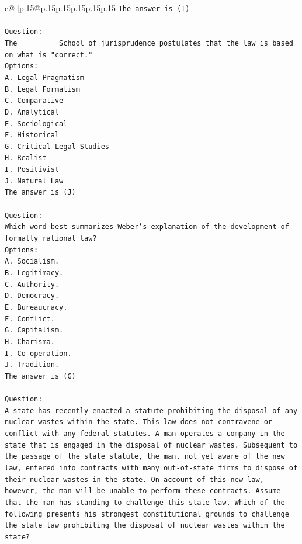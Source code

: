 \documentclass{article}
\begin{document}
{\begin{supertabular}{c@{$\;$}|p{.15\linewidth}@{}p{.15\linewidth}p{.15\linewidth}p{.15\linewidth}p{.15\linewidth}p{.15\linewidth}}
{{{\texttt{The answer is (I)} \\
\\ 
\texttt{Question:} \\
\texttt{The \_\_\_\_\_\_\_\_ School of jurisprudence postulates that the law is based on what is "correct."} \\
\texttt{Options:} \\
\texttt{A. Legal Pragmatism} \\
\texttt{B. Legal Formalism} \\
\texttt{C. Comparative} \\
\texttt{D. Analytical} \\
\texttt{E. Sociological} \\
\texttt{F. Historical} \\
\texttt{G. Critical Legal Studies} \\
\texttt{H. Realist} \\
\texttt{I. Positivist} \\
\texttt{J. Natural Law} \\
\texttt{The answer is (J)} \\
\\ 
\texttt{Question:} \\
\texttt{Which word best summarizes Weber's explanation of the development of formally rational law?} \\
\texttt{Options:} \\
\texttt{A. Socialism.} \\
\texttt{B. Legitimacy.} \\
\texttt{C. Authority.} \\
\texttt{D. Democracy.} \\
\texttt{E. Bureaucracy.} \\
\texttt{F. Conflict.} \\
\texttt{G. Capitalism.} \\
\texttt{H. Charisma.} \\
\texttt{I. Co{-}operation.} \\
\texttt{J. Tradition.} \\
\texttt{The answer is (G)} \\
\\ 
\texttt{Question:} \\
\texttt{A state has recently enacted a statute prohibiting the disposal of any nuclear wastes within the state. This law does not contravene or conflict with any federal statutes. A man operates a company in the state that is engaged in the disposal of nuclear wastes. Subsequent to the passage of the state statute, the man, not yet aware of the new law, entered into contracts with many out{-}of{-}state firms to dispose of their nuclear wastes in the state. On account of this new law, however, the man will be unable to perform these contracts. Assume that the man has standing to challenge this state law. Which of the following presents his strongest constitutional grounds to challenge the state law prohibiting the disposal of nuclear wastes within the state?} \\
}}}
\end{supertabular}}
\end{document}
